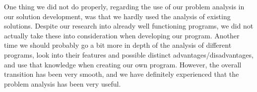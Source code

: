 One thing we did not do properly, regarding the use of our problem analysis in our solution development, was that we hardly used the analysis of existing solutions. Despite our research into already well functioning programs, we did not actually take these into consideration when developing our program. Another time we should probably go a bit more in depth of the analysis of different programs, look into their features and possible distinct advantages/disadvantages, and use that knowledge when creating our own program. However, the overall transition has been very smooth, and we have definitely experienced that the problem analysis has been very useful.